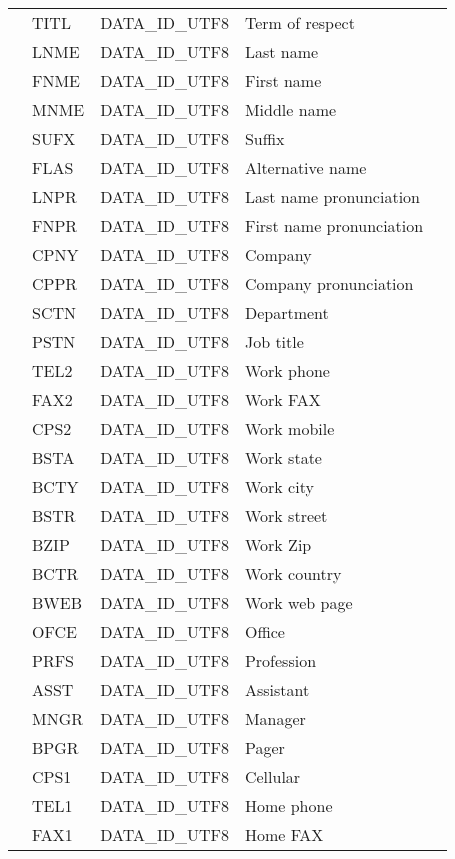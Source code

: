 \begin{longtable}[c]{|l|l|l|p{3cm}|p{5cm}|}
        & TITL & DATA\_ID\_UTF8 & Term of respect & \\
        & LNME & DATA\_ID\_UTF8 & Last name & \\
        & FNME & DATA\_ID\_UTF8 & First name & \\
        & MNME & DATA\_ID\_UTF8 & Middle name & \\
        & SUFX & DATA\_ID\_UTF8 & Suffix & \\
        & FLAS & DATA\_ID\_UTF8 & Alternative name & \\
        & LNPR & DATA\_ID\_UTF8 & Last name pronunciation & \\
        & FNPR & DATA\_ID\_UTF8 & First name pronunciation & \\
        & CPNY & DATA\_ID\_UTF8 & Company & \\
        & CPPR & DATA\_ID\_UTF8 & Company pronunciation & \\
        & SCTN & DATA\_ID\_UTF8 & Department & \\
        & PSTN & DATA\_ID\_UTF8 & Job title & \\
        & TEL2 & DATA\_ID\_UTF8 & Work phone & \\
        & FAX2 & DATA\_ID\_UTF8 & Work FAX & \\
        & CPS2 & DATA\_ID\_UTF8 & Work mobile & \\
        & BSTA & DATA\_ID\_UTF8 & Work state & \\
        & BCTY & DATA\_ID\_UTF8 & Work city & \\
        & BSTR & DATA\_ID\_UTF8 & Work street & \\
        & BZIP & DATA\_ID\_UTF8 & Work Zip & \\
        & BCTR & DATA\_ID\_UTF8 & Work country & \\
        & BWEB & DATA\_ID\_UTF8 & Work web page & \\
        & OFCE & DATA\_ID\_UTF8 & Office & \\
        & PRFS & DATA\_ID\_UTF8 & Profession & \\
        & ASST & DATA\_ID\_UTF8 & Assistant & \\
        & MNGR & DATA\_ID\_UTF8 & Manager & \\
        & BPGR & DATA\_ID\_UTF8 & Pager & \\
        & CPS1 & DATA\_ID\_UTF8 & Cellular & \\
        & TEL1 & DATA\_ID\_UTF8 & Home phone & \\
        & FAX1 & DATA\_ID\_UTF8 & Home FAX & \\

\end{longtable}
